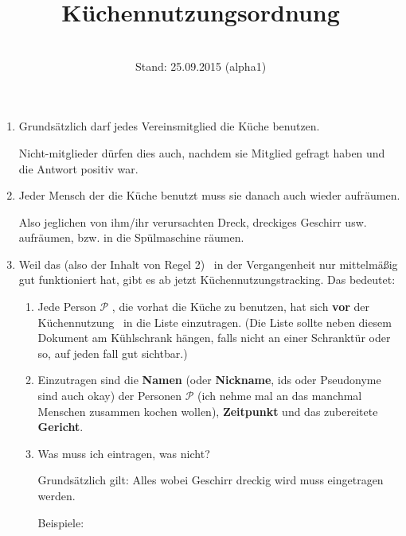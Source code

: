 \documentclass{article}
\newcommand{\tmaffiliation}[1]{\\ #1}
\newcommand{\tmstrong}[1]{\textbf{#1}}
\begin{document}
\title{K{\"u}chennutzungsordnung}

\author{\tmaffiliation{Stand: 25.09.2015 (alpha1)}}

\maketitle


\begin{enumerate}
  \item Grunds{\"a}tzlich darf jedes Vereinsmitglied die K{\"u}che benutzen.
  
  Nicht-mitglieder d{\"u}rfen dies auch, nachdem sie Mitglied gefragt haben
  und die Antwort positiv war.
  
  \item Jeder Mensch der die K{\"u}che benutzt muss sie danach auch wieder
  aufr{\"a}umen.
  
  Also jeglichen von ihm/ihr verursachten Dreck, dreckiges Geschirr usw.
  aufr{\"a}umen, bzw. in die Sp{\"u}lmaschine r{\"a}umen.
  
  \item Weil das (also der Inhalt von Regel 2) \ in der Vergangenheit nur
  mittelm{\"a}{\ss}ig gut funktioniert hat, gibt es ab jetzt
  K{\"u}chennutzungstracking. Das bedeutet:
  \begin{enumerate}
    \item Jede Person $\mathcal{P}$ , die vorhat die K{\"u}che zu benutzen,
    hat sich {\tmstrong{vor}} der K{\"u}chennutzung \ in die Liste
    einzutragen. (Die Liste sollte neben diesem Dokument am K{\"u}hlschrank
    h{\"a}ngen, falls nicht an einer Schrankt{\"u}r oder so, auf jeden fall
    gut sichtbar.)
    
    \item Einzutragen sind die {\tmstrong{Namen}} (oder {\tmstrong{Nickname}},
    ids oder Pseudonyme sind auch okay) der Personen $\mathcal{P}$ (ich nehme
    mal an das manchmal Menschen zusammen kochen wollen),
    {\tmstrong{Zeitpunkt}} und das zubereitete {\tmstrong{Gericht}}.
    
    \item Was muss ich eintragen, was nicht?
    
    Grunds{\"a}tzlich gilt: Alles wobei Geschirr dreckig wird muss eingetragen
    werden.
    
    Beispiele:
    \begin{description}
\end{description}
\end{enumerate}
\end{enumerate}
\end{document}
